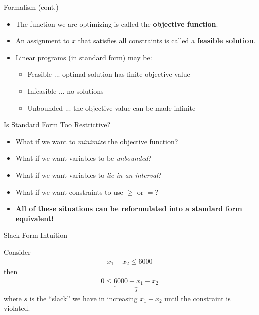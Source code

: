 \documentclass{beamer}
\begin{document}
\begin{frame}{Formalism (cont.)}
    \begin{itemize}
        \item<1-> The function we are optimizing is called the \textbf{objective function}.
        \item<2-> An assignment to $x$ that satisfies all constraints is called a \textbf{feasible solution}.
        \item<3-> Linear programs (in standard form) may be:
        \begin{itemize}
            \item<3-> Feasible ... optimal solution has finite objective value
            \item<4-> Infeasible ... no solutions
            \item<5-> Unbounded ... the objective value can be made infinite
        \end{itemize}
    \end{itemize}
\end{frame}

\begin{frame}{Is Standard Form Too Restrictive?}
    \begin{itemize}
        \item<1-> What if we want to \textit{minimize} the objective function?
        \item<2-> What if we want variables to be \textit{unbounded}?
        \item<3-> What if we want variables to \textit{lie in an interval}?
        \item<4-> What if we want constraints to use $\geq$ or $=$?
        \item<5-> \textbf{All of these situations can be reformulated into a standard form equivalent!}
    \end{itemize}
\end{frame}

\begin{frame}{Slack Form Intuition}
    \begin{example}
        Consider
        \begin{align*}
            x_1 + x_2 \leq 6000
        \end{align*}
        \pause
        then
        \begin{align*}
            0 \leq \underbrace{6000 - x_1 - x_2}_{s}
        \end{align*}
        \pause
        where $s$ is the ``slack'' we have in increasing $x_1 + x_2$ until the constraint is violated. 
    \end{example}
\end{frame}
\end{document}
